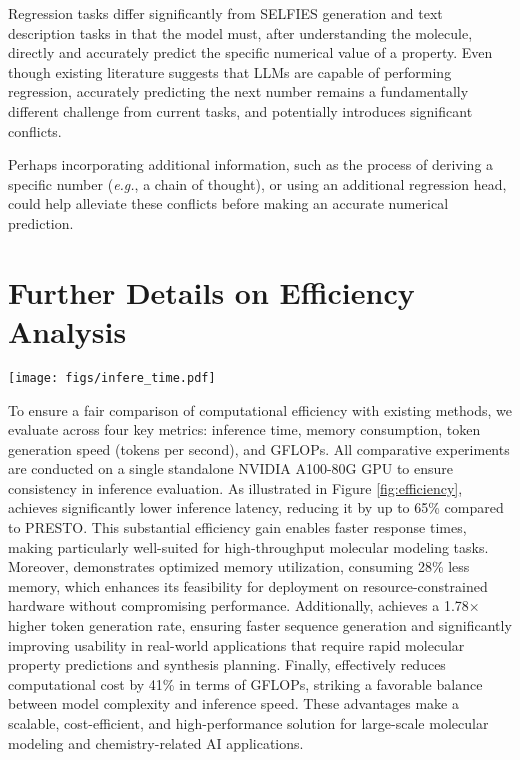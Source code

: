 Regression tasks differ significantly from SELFIES generation and text description tasks in that the model must, after understanding the molecule, directly and accurately predict the specific numerical value of a property. Even though existing literature suggests that LLMs are capable of performing regression, accurately predicting the next number remains a fundamentally different challenge from current tasks, and potentially introduces significant conflicts.


Perhaps incorporating additional information, such as the process of deriving a specific number (\emph{e.g.}, a chain of thought), or using an additional regression head, could help alleviate these conflicts before making an accurate numerical prediction.




\section{Further Details on Efficiency Analysis}

\begin{figure*}[h]
    \centering
    \texttt{[image: figs/infere\_time.pdf]}
    \vspace{-0.4cm}
    \caption{A comprehensive efficiency evaluation of our \method, built on LLaMA 3.2-1B, compared to the state-of-the-art baseline. We conduct all experiments three times and compute the average result.}
    \label{fig:efficiency}
\end{figure*}


To ensure a fair comparison of computational efficiency with existing methods, we evaluate \method across four key metrics: inference time, memory consumption, token generation speed (tokens per second), and GFLOPs. All comparative experiments are conducted on a single standalone NVIDIA A100-80G GPU to ensure consistency in inference evaluation.
As illustrated in Figure \ref{fig:efficiency}, \method achieves significantly lower inference latency, reducing it by up to 65\% compared to PRESTO. This substantial efficiency gain enables faster response times, making \method particularly well-suited for high-throughput molecular modeling tasks.
Moreover, \method demonstrates optimized memory utilization, consuming 28\% less memory, which enhances its feasibility for deployment on resource-constrained hardware without compromising performance. Additionally, \method achieves a 1.78$\times$ higher token generation rate, ensuring faster sequence generation and significantly improving usability in real-world applications that require rapid molecular property predictions and synthesis planning.
Finally, \method effectively reduces computational cost by 41\% in terms of GFLOPs, striking a favorable balance between model complexity and inference speed. These advantages make \method a scalable, cost-efficient, and high-performance solution for large-scale molecular modeling and chemistry-related AI applications.

